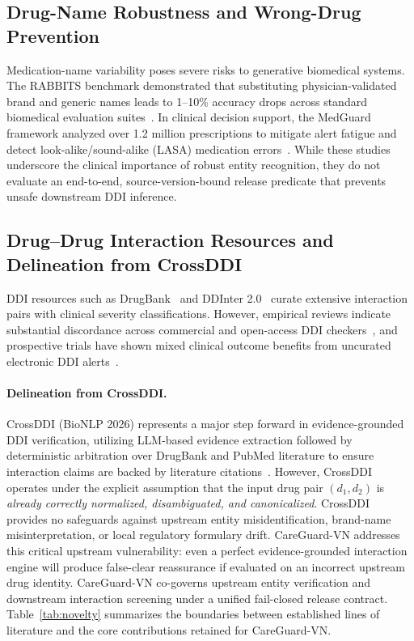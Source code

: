 \documentclass[11pt]{article}
\begin{document}
\subsection{Drug-Name Robustness and Wrong-Drug Prevention}
Medication-name variability poses severe risks to generative biomedical systems. The RABBITS benchmark demonstrated that substituting physician-validated brand and generic names leads to 1--10\% accuracy drops across standard biomedical evaluation suites~\cite{gallifant2024rabbits}. In clinical decision support, the MedGuard framework analyzed over 1.2 million prescriptions to mitigate alert fatigue and detect look-alike/sound-alike (LASA) medication errors~\cite{chen2024medguard}. While these studies underscore the clinical importance of robust entity recognition, they do not evaluate an end-to-end, source-version-bound release predicate that prevents unsafe downstream DDI inference.

\subsection{Drug--Drug Interaction Resources and Delineation from CrossDDI}
DDI resources such as DrugBank~\cite{wishart2018drugbank} and DDInter 2.0~\cite{tian2025ddinter,ddinterdownload2026} curate extensive interaction pairs with clinical severity classifications. However, empirical reviews indicate substantial discordance across commercial and open-access DDI checkers~\cite{gibson2026ddireview}, and prospective trials have shown mixed clinical outcome benefits from uncurated electronic DDI alerts~\cite{holbrook2025alerts}.

\paragraph{Delineation from CrossDDI.}
CrossDDI (BioNLP 2026) represents a major step forward in evidence-grounded DDI verification, utilizing LLM-based evidence extraction followed by deterministic arbitration over DrugBank and PubMed literature to ensure interaction claims are backed by literature citations~\cite{crossddi2026}. However, CrossDDI operates under the explicit assumption that the input drug pair $(d_1, d_2)$ is \emph{already correctly normalized, disambiguated, and canonicalized}. CrossDDI provides no safeguards against upstream entity misidentification, brand-name misinterpretation, or local regulatory formulary drift. CareGuard-VN addresses this critical upstream vulnerability: even a perfect evidence-grounded interaction engine will produce false-clear reassurance if evaluated on an incorrect upstream drug identity. CareGuard-VN co-governs upstream entity verification and downstream interaction screening under a unified fail-closed release contract. Table~\ref{tab:novelty} summarizes the boundaries between established lines of literature and the core contributions retained for CareGuard-VN.
\end{document}
